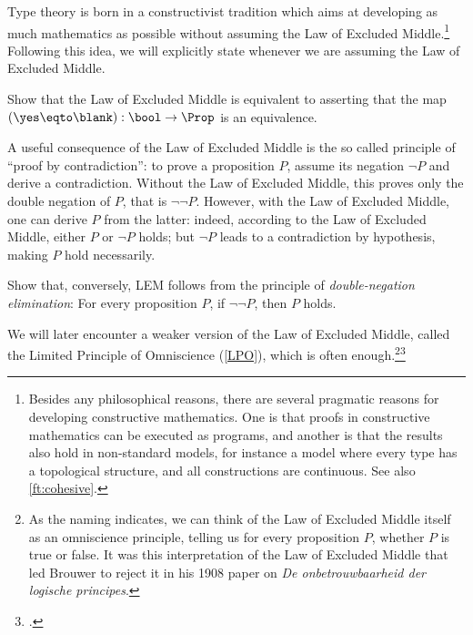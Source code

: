 Type theory is born
in a constructivist tradition
which aims at developing as much mathematics as
possible without assuming the Law of Excluded Middle.\footnote{%
  Besides any philosophical reasons,
  there are several pragmatic reasons
  for developing constructive mathematics.
  One is that proofs in constructive mathematics
  can be executed as programs,
  and another is that the results also hold in non-standard models,
  for instance a model where every type has a topological structure,
  and all constructions are continuous.
  See also \cref{ft:cohesive}.}
Following this idea, we will
explicitly state whenever we are assuming the Law of Excluded Middle.
\begin{xca}\label{xca:lem-prop}
  Show that the Law of Excluded Middle is equivalent to asserting
  that the map $(\yes \eqto \blank) : \bool \to \Prop$
  is an equivalence.
\end{xca}
A useful consequence of the Law of Excluded Middle is the so called principle of ``proof by
contradiction'': to prove a proposition $P$, assume its negation $\neg P$
and derive a contradiction. Without the Law of Excluded Middle, this proves only the double negation of
$P$, that is $\neg \neg P$.  However, with the Law of Excluded Middle, one can derive $P$
from the latter: indeed, according to the Law of Excluded Middle, either $P$ or $\neg P$ holds;
but $\neg P$ leads to a contradiction by hypothesis, making $P$ hold
necessarily.


\begin{xca}\label{xca:dne-lem}
  Show that, conversely, LEM follows from the principle of
  \emph{double-negation elimination}:
  For every proposition $P$, if $\neg \neg P$, then $P$ holds.
\end{xca}

\begin{remark}
  We will later encounter a weaker version of the Law of Excluded Middle, called the Limited
  Principle of Omniscience (\cref{LPO}), which is often enough.\footnote{%
    As the naming indicates, we can think of the Law of Excluded Middle itself as an omniscience
    principle, telling us for every proposition $P$,
    whether $P$ is true or false.
    It was this interpretation of the Law of Excluded Middle that led Brouwer to reject it
    in his 1908 paper on \emph{De onbetrouwbaarheid der logische
      principes}.\footnotemark{}}\footcitetext{Brouwer-1908}
\end{remark}

